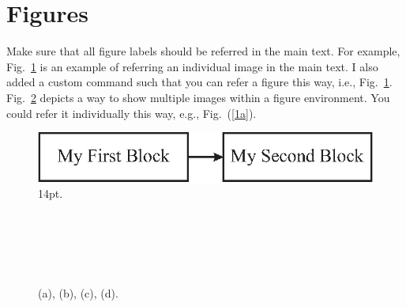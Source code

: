\documentclass[lettersize,journal]{IEEEtran}
\newcommand\figref{Fig.~\ref}
\begin{document}
\lipsum[1]


\section{Figures}
\label{sec:figures}

Make sure that all figure labels should be referred in the main text.
For example, Fig.~\ref{fig:figure1} is an example of referring an individual image in the main text.
I also added a custom command such that you can refer a figure this way, i.e., \figref{fig:figure1}.
Fig.~\ref{fig:figure4x1} depicts a way to show multiple images within a figure environment.
You could refer it individually this way, e.g., Fig.~(\ref{1a}).


    \begin{figure}[tbp]
      \begin{center}{}
          \includegraphics[width=1\columnwidth,draft=false]{./figs/figure1.eps}
          \caption{14pt.}
          \label{fig:figure1}
      \end{center}
    \end{figure}

    \begin{figure}[tbp]
        \centering
      \\
        \\
        \\\
      \caption{(a), (b), (c), (d).}
      \label{fig:figure4x1} 
    \end{figure}
    
\end{document}
